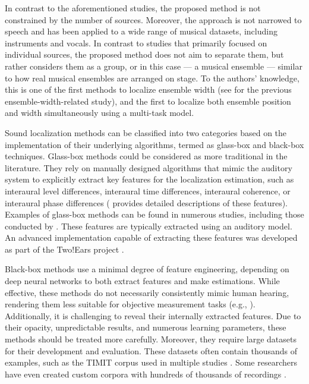 \documentclass[11pt]{article}
\begin{document}
In contrast to the aforementioned studies, the proposed method is not constrained by the number of sources. Moreover, the approach is not narrowed to speech and has been applied to a wide range of musical datasets, including instruments and vocals. In contrast to studies that primarily focused on individual sources, the proposed method does not aim to separate them, but rather considers them as a group, or in this case --- a musical ensemble --- similar to how real musical ensembles are arranged on stage. To the authors' knowledge, this is one of the first methods to localize ensemble width (see \textcite{antoniuk_blind_2023} for the previous ensemble-width-related study), and the first to localize both ensemble position and width simultaneously using a multi-task model.

Sound localization methods can be classified into two categories based on the implementation of their underlying algorithms, termed as glass-box and black-box techniques. Glass-box methods could be considered as more traditional in the literature. They rely on manually designed algorithms that mimic the auditory system to explicitly extract key features for the localization estimation, such as interaural level differences, interaural time differences, interaural coherence, or interaural phase differences (\textcite{blauert_spatial_1996} provides detailed descriptions of these features). Examples of glass-box methods can be found in numerous studies, including those conducted by \textcite{dietz_auditory_2011, may_probabilistic_2011, may_binaural_2012, may_robust_2015, woodruff_binaural_2012, ma16c_interspeech, ma_exploiting_2017, ma_robust_2018, zielinski_automatic_2022}. These features are typically extracted using an auditory model. An advanced implementation capable of extracting these features was developed as part of the Two!Ears project \parencite{raake_computational_2016}.

Black-box methods use a minimal degree of feature engineering, depending on deep neural networks to both extract features and make estimations. While effective, these methods do not necessarily consistently mimic human hearing, rendering them less suitable for objective measurement tasks (e.g., \textcite{vera-diaz_towards_2018, yang_deepear_2022}). Additionally, it is challenging to reveal their internally extracted features. Due to their opacity, unpredictable results, and numerous learning parameters, these methods should be treated more carefully. Moreover, they require large datasets for their development and evaluation. These datasets often contain thousands of examples, such as the TIMIT corpus \parencite{garofolo_darpa_1993} used in multiple studies \parencite{yang_deepear_2022, benaroya_binaural_2018, wang_binaural_2020, vera-diaz_towards_2018, ma_exploiting_2017, pang_multitask_2019, ma_robust_2018, may_robust_2015}. Some researchers have even created custom corpora with hundreds of thousands of recordings \parencite{antoniuk_blind_2023, zielinski_automatic_2022, zielinski_spatial_2022, zielinski_comparison_2020}.
\end{document}
